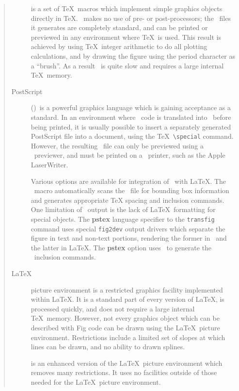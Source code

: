 \begin{quote}
\begin{description}
\item[\PicTeX]
	is a set of \TeX\ macros which implement simple
		graphics objects directly in \TeX.
	\PicTeX\ makes no use of pre- or post-processors; the \DVI\ files it
		generates are completely standard, and can be printed or
		previewed in any environment where \TeX\ is used.
	This result is achieved by using \TeX\ integer arithmetic to
		do all plotting calculations, and by drawing the figure
		using the period character as a ``brush''.
	As a result \PicTeX\ is quite slow and requires a large internal
		\TeX\ memory.

\item[PostScript]
	(\PS)\, is a powerful graphics language which is gaining
		acceptance as a standard.
	In an environment where \DVI\ code is translated into \PS\ before
		being printed, it is usually possible to insert a
		separately generated PostScript file into a 
		document, using the \TeX\ {\verb|\special|} command.
	However, the resulting \PS\ file can only be previewed using a
		\PS\ previewer, and must be printed on a \PS\ printer,
		such as the Apple LaserWriter.

	Various options are available for integration of \PS\ with \LaTeX.
	The \psfig\ macro automatically scans the \PS\ file for bounding box
		information and generates appropriate TeX spacing and inclusion
		commands.
	One limitation of \PS\ output is the lack of \LaTeX\ formatting for
		special objects.
	The {\bf pstex} language specifier to the {\tt transfig} command
		uses special {\tt fig2dev} output drivers which separate
		the figure in text and non-text portions, rendering the
		former in \PS\ and the latter in \LaTeX.
	The {\bf pstex} option uses \psfig\ to generate the \PS\ inclusion
		commands.

\item[\LaTeX]
	picture environment is a restricted graphics facility implemented
		within \LaTeX.
	It is a standard part of every version of \LaTeX, is processed
		quickly, and does not require a large internal \TeX\ memory.
	However, not every graphics object which can be described with
		 Fig code can be drawn using the \LaTeX\ picture environment.
	Restrictions include a limited set of slopes at which lines can be
		drawn, and no ability to drawn splines.

\item[\EPIC]
	is an enhanced version of the \LaTeX\ picture environment which
		removes many restrictions.
	It uses no facilities outside 	of those needed for the
		\LaTeX\ picture environment.


\end{description}
\end{quote}
